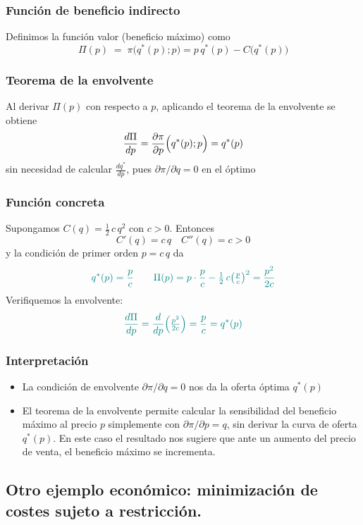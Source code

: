 \documentclass{article}
\begin{document}
\subsubsection*{Función de beneficio indirecto}

Definimos la función valor (beneficio máximo) como
\[
\Pi(p) \;=\;\pi\bigl(q^*(p);p\bigr)
= p\,q^*(p) - C\bigl(q^*(p)\bigr)
\]

\subsubsection*{Teorema de la envolvente}

Al derivar \(\Pi(p)\) con respecto a \(p\), aplicando el teorema de la envolvente se obtiene
\[
\frac{d\Pi}{dp}
= \frac{\partial\pi}{\partial p}\Bigl(q^*(p);p\Bigr)
= q^*(p)
\]
sin necesidad de calcular \(\tfrac{dq^*}{dp}\), pues \(\partial\pi/\partial q=0\) en el óptimo  

\subsubsection*{Función concreta}

Supongamos \(C(q)=\tfrac12\,c\,q^2\) con \(c>0\). Entonces
\[
C'(q)=c\,q\quad C''(q)=c>0
\]
y la condición de primer orden \(p=c\,q\) da
\[\color{teal}
q^*(p)=\frac{p}{c}\qquad \Pi(p)=p\cdot\frac{p}{c}-\tfrac12\,c\bigl(\tfrac{p}{c}\bigr)^2
=\frac{p^2}{2c}
\]
Verifiquemos la envolvente:
\[\color{teal}
\frac{d\Pi}{dp}
=\frac{d}{dp}\Bigl(\tfrac{p^2}{2c}\Bigr)
=\frac{p}{c}
=q^*(p)
\]

\subsubsection*{Interpretación}

\begin{itemize}
  \item La condición de envolvente \(\partial\pi/\partial q=0\) nos da la oferta óptima
    \(q^*(p)\)
  \item El teorema de la envolvente permite calcular la sensibilidad del beneficio máximo
    al precio \(p\) simplemente con \(\partial\pi/\partial p = q\), sin derivar la curva
    de oferta \(q^*(p)\). En este caso el resultado nos sugiere que ante un aumento del precio de venta, el beneficio máximo se incrementa.
\end{itemize}

\subsection*{Otro ejemplo económico: minimización de costes sujeto a restricción.}
\end{document}
